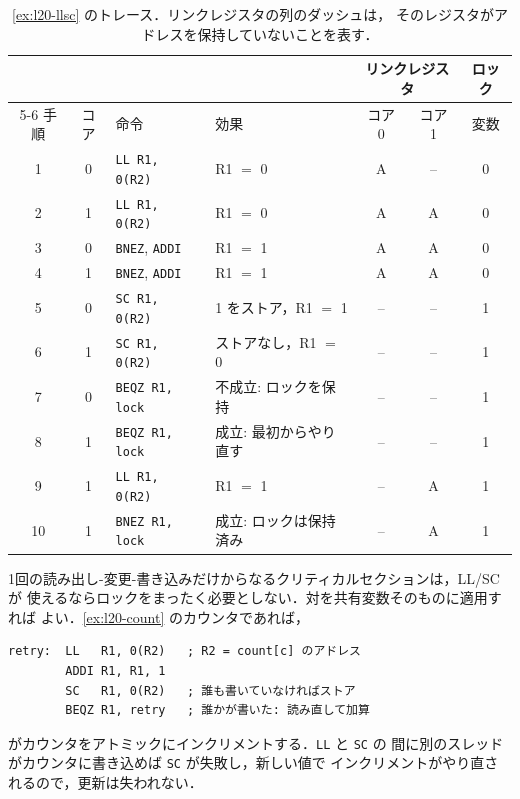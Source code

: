 \documentclass[../main.tex]{subfiles}
\begin{document}
\begin{table}[htbp]
  \centering\small
  \caption{\cref{ex:l20-llsc} のトレース．リンクレジスタの列のダッシュは，
    そのレジスタがアドレスを保持していないことを表す．}
  \label{tab:l20-llsc}
  \begin{tabular}{@{}ccllccc@{}}
    \toprule
    & & & & \multicolumn{2}{c}{リンクレジスタ} & ロック \\
    \cmidrule(lr){5-6}
    手順 & コア & 命令 & 効果 & コア 0 & コア 1 & 変数 \\
    \midrule
    1  & 0 & \texttt{LL R1, 0(R2)}  & R1 $=$ 0                  & A  & -- & 0 \\
    2  & 1 & \texttt{LL R1, 0(R2)}  & R1 $=$ 0                  & A  & A  & 0 \\
    3  & 0 & \texttt{BNEZ}, \texttt{ADDI} & R1 $=$ 1            & A  & A  & 0 \\
    4  & 1 & \texttt{BNEZ}, \texttt{ADDI} & R1 $=$ 1            & A  & A  & 0 \\
    5  & 0 & \texttt{SC R1, 0(R2)}  & 1 をストア，R1 $=$ 1      & -- & -- & 1 \\
    6  & 1 & \texttt{SC R1, 0(R2)}  & ストアなし，R1 $=$ 0      & -- & -- & 1 \\
    7  & 0 & \texttt{BEQZ R1, lock} & 不成立: ロックを保持      & -- & -- & 1 \\
    8  & 1 & \texttt{BEQZ R1, lock} & 成立: 最初からやり直す    & -- & -- & 1 \\
    9  & 1 & \texttt{LL R1, 0(R2)}  & R1 $=$ 1                  & -- & A  & 1 \\
    10 & 1 & \texttt{BNEZ R1, lock} & 成立: ロックは保持済み    & -- & A  & 1 \\
    \bottomrule
  \end{tabular}
\end{table}

1回の読み出し-変更-書き込みだけからなるクリティカルセクションは，LL/SC が
使えるならロックをまったく必要としない．対を共有変数そのものに適用すれば
よい．\cref{ex:l20-count} のカウンタであれば，
\begin{lstlisting}[language={[x86masm]Assembler}, numbers=none]
retry:  LL   R1, 0(R2)   ; R2 = count[c] のアドレス
        ADDI R1, R1, 1
        SC   R1, 0(R2)   ; 誰も書いていなければストア
        BEQZ R1, retry   ; 誰かが書いた: 読み直して加算
\end{lstlisting}
がカウンタをアトミックにインクリメントする．\texttt{LL} と \texttt{SC} の
間に別のスレッドがカウンタに書き込めば \texttt{SC} が失敗し，新しい値で
インクリメントがやり直されるので，更新は失われない．
\end{document}
